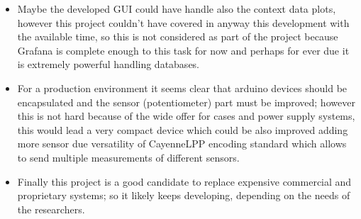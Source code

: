 \documentclass[11pt,a4paper,dvipsnames,twoside]{article}
\begin{document}
\begin{itemize}
    \item Maybe the developed GUI could have handle also the context data plots, however this project couldn't have covered in anyway this development with the available time, so this is not considered as part of the project because Grafana is complete enough to this task for now and perhaps for ever due it is extremely powerful handling databases.
    \item For a production environment it seems clear that arduino devices should be encapsulated and the sensor (potentiometer) part must be improved; however this is not hard because of the wide offer for cases and power supply systems, this would lead a very compact device which could be also improved adding more sensor due versatility of CayenneLPP encoding standard which allows to send multiple measurements of different sensors. 
    \item Finally this project is a good candidate to replace expensive commercial and proprietary systems; so it likely keeps developing, depending on the needs of the researchers.
\end{itemize}

\newpage
{}
{}
\printbibliography
\end{document}
